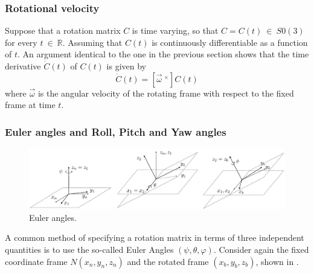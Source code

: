  \subsubsection{Rotational velocity}

 Suppose that a rotation matrix $C$ is time varying, so that $C=C(t)\ \in\ S0(3)$ for every $t\ \in\ \mathbb{R}$. Assuming that $C(t)$ is continuously differentiable as a function of $t$. An argument identical to the one in the previous section shows that the time derivative $\dot{C}(t)$ of $C(t)$ is given by
 \begin{equation}
   \dot{C}(t)=[\vec{\omega}\ ^\times]C(t)
 \end{equation} where $\vec{\omega}$ is the angular velocity of the rotating frame with respect to the fixed frame at time $t$.

 \subsubsection{Euler angles and Roll, Pitch and Yaw angles}
 \begin{figure}[H]
     \centering
     \includegraphics[width =\textwidth]{figures/euler.png}
     \caption{Euler angles.}
     \label{fig:euler_an}
   \end{figure}

 A common method of specifying a rotation matrix in terms of three independent quantities is to use the so-called Euler Angles $(\psi,\theta,\varphi)$. Consider again the fixed coordinate frame $N(x_n,y_n,z_n)$ and the rotated frame $(x_b,y_b,z_b)$, shown in .

